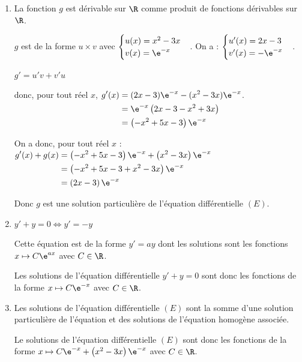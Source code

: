 	\begin{enumerate}
		\item La fonction $g$ est dérivable sur $\R$ comme produit de fonctions dérivables sur $\R$.

		$g$ est de la forme $u\times v$ avec $\begin{cases}u(x) = x^2-3x \\ v(x) =\e^{-x}  \end{cases}$. On a : $\begin{cases}u'(x) = 2x-3 \\ v'(x) =-\e^{-x}  \end{cases}$.

		$g'= u'v + v'u$

		donc, pour tout réel $x$, $\begin{aligned}[t] g'(x) &= (2x-3) \e^{-x}  - (x^2-3x) \e^{-x} \\
			&= \e^{-x} \left( 2x-3-x^2+3x\right) \\
			&= \left( -x^2 + 5x-3\right) \e^{-x}
		\end{aligned}$.

		On a donc, pour tout réel $x$ : $\begin{aligned}[t] g'(x) + g(x) & = \left( -x^2 + 5x-3\right) \e^{-x} + \left( x^2 - 3x\right) \e^{-x}\\
			&= \left( -x^2 + 5x-3 +  x^2 - 3x\right) \e^{-x}\\
			&= \left(  2x-3 \right) \e^{-x}
		\end{aligned}$

		Donc $g$ est une solution particulière de l'équation différentielle  $(E)$.

		\item  $y' + y =0 \iff  y'= -y$

		Cette équation est de la forme $y'=ay$ dont les solutions sont les fonctions $x \mapsto C \e^{ax}$ avec $C\in \R$.



		Les solutions de l'équation différentielle \quad $y'+y=0$ sont donc les fonctions de la forme $x \mapsto C\e^{-x}$ avec $C \in \R$.

		\item Les solutions de l'équation différentielle $(E)$ sont la somme d'une solution particulière de l'équation et des solutions de l'équation homogène associée.

		Le solutions de l'équation différentielle $(E)$ sont donc les fonctions de la forme $x \mapsto C\e^{-x} +\left(  x^2- 3x \right) \e^{-x}$ avec $C\in \R$.


\end{enumerate}
